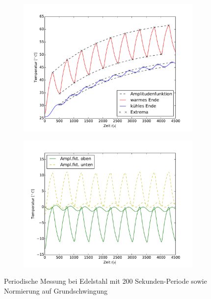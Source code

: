 \begin{figure}[p]
	\label{fig:M3Edelstahl}
	\centering
	\begin{subfigure}{0.9\textwidth}
	\centering
	\includegraphics[width=\textwidth]{Bilder/M3_Edelstahl.pdf}
	\end{subfigure}
	\begin{subfigure}{0.9\textwidth}
	\centering
	\includegraphics[width=\textwidth]{Bilder/Normierungsauswahl/M3_Edelstahl_norm.pdf}
	\end{subfigure}
	\caption{Periodische Messung bei Edelstahl mit 200 Sekunden-Periode sowie Normierung auf Grundschwingung}
\end{figure}

